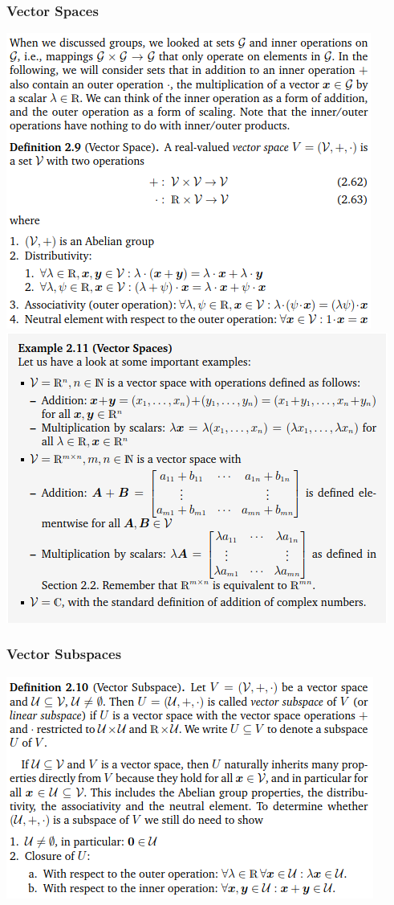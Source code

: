 \documentclass[oneside]{article}
\begin{document}
\begin{multicols}{2}
\subsubsection*{Vector Spaces}
\includegraphics[width=\linewidth]{2.4_2}
\includegraphics[width=\linewidth]{2.4_3}

\subsubsection*{Vector Subspaces}
\includegraphics[width=\linewidth]{2.4_4}

\end{multicols}
\end{document}
